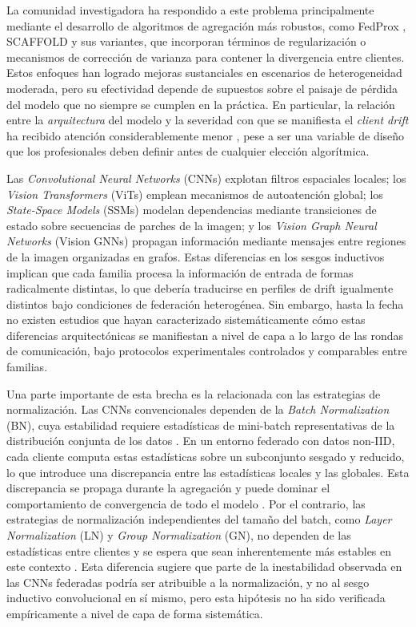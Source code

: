 La comunidad investigadora ha respondido a este problema principalmente mediante el desarrollo 
de algoritmos de agregación más robustos, como FedProx \cite{DBLP:journals/corr/abs-1812-06127}, 
SCAFFOLD \cite{DBLP:journals/corr/abs-1910-06378} y sus variantes, que incorporan términos de 
regularización o mecanismos de corrección de varianza para contener la divergencia entre clientes. 
Estos enfoques han logrado mejoras sustanciales en escenarios de heterogeneidad moderada, pero 
su efectividad depende de supuestos sobre el paisaje de pérdida del modelo que no siempre se cumplen 
en la práctica. En particular, la relación entre la \textit{arquitectura} del modelo y la severidad 
con que se manifiesta el \textit{client drift} ha recibido atención considerablemente menor 
\cite{qu2022rethinking, siomos2024architecture}, pese a ser una variable de diseño que los 
profesionales deben definir antes de cualquier elección algorítmica.


Las \textit{Convolutional Neural Networks} (CNNs) explotan filtros espaciales locales; los 
\textit{Vision Transformers} (ViTs) emplean mecanismos de autoatención global; los 
\textit{State-Space Models} (SSMs) modelan dependencias mediante transiciones de estado sobre 
secuencias de parches de la imagen; y los \textit{Vision Graph Neural Networks} (Vision GNNs) 
propagan información mediante mensajes entre regiones de la imagen organizadas en grafos. Estas 
diferencias en los sesgos inductivos implican que cada familia procesa la información de entrada 
de formas radicalmente distintas, lo que debería traducirse en perfiles de drift igualmente 
distintos bajo condiciones de federación heterogénea. Sin embargo, hasta la fecha no existen 
estudios que hayan caracterizado sistemáticamente cómo estas diferencias arquitectónicas se 
manifiestan a nivel de capa a lo largo de las rondas de comunicación, bajo protocolos 
experimentales controlados y comparables entre familias.


Una parte importante de esta brecha es la relacionada con las estrategias de normalización. 
Las CNNs convencionales dependen de la \textit{Batch Normalization} (BN), cuya 
estabilidad requiere estadísticas de mini-batch representativas de la distribución conjunta de 
los datos \cite{DBLP:journals/corr/abs-1803-08494}. En un entorno federado con datos non-IID, 
cada cliente computa estas estadísticas sobre un subconjunto sesgado y reducido, lo que introduce 
una discrepancia entre las estadísticas locales y las globales. Esta discrepancia se propaga 
durante la agregación y puede dominar el comportamiento de convergencia de todo el modelo 
\cite{du2022rethinking}. Por el contrario, las estrategias de normalización independientes del 
tamaño del batch, como \textit{Layer Normalization} (LN) y \textit{Group Normalization} (GN), 
no dependen de las estadísticas entre clientes y se espera que sean inherentemente más estables 
en este contexto \cite{wang2023batch, casella2023experimentingnormalizationlayersfederated}. 
Esta diferencia sugiere que parte de la inestabilidad observada en las CNNs federadas podría 
ser atribuible a la normalización, y no al sesgo inductivo convolucional en sí mismo, pero esta 
hipótesis no ha sido verificada empíricamente a nivel de capa de forma sistemática.



